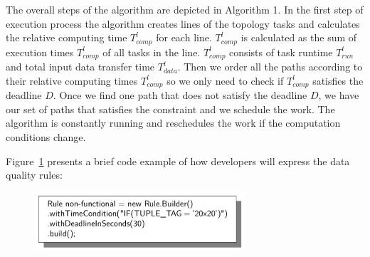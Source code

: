 The overall steps of the algorithm are depicted in Algorithm 1. In the first step of execution process the algorithm creates lines of the topology tasks and calculates the relative computing time $T_{comp}^l$ for each line. $T_{comp}^l$ is calculated as the sum of execution times $T_{comp}^l$ of all tasks in the line. $T_{comp}^l$ consists of task runtime $T_{run}^t$ and total input data transfer time $T_{data}^t$. Then we order all the paths according to their relative computing times $T_{comp}^l$ so we only need to check if $T_{comp}^l$ satisfies the deadline $D$. Once we find one path that does not satisfy the deadline $D$, we have our set of paths that satisfies the constraint and we schedule the work. The algorithm is constantly running and reschedules the work if the computation conditions change.

Figure~\ref{fig:qosRule} presents a brief code example of how developers will express the data quality rules:

\begin{figure}[h!]
  \centering
  \includegraphics[width=0.7\textwidth]{Figures/qosRule.pdf}
  \label{fig:qosRule}
\end{figure}

